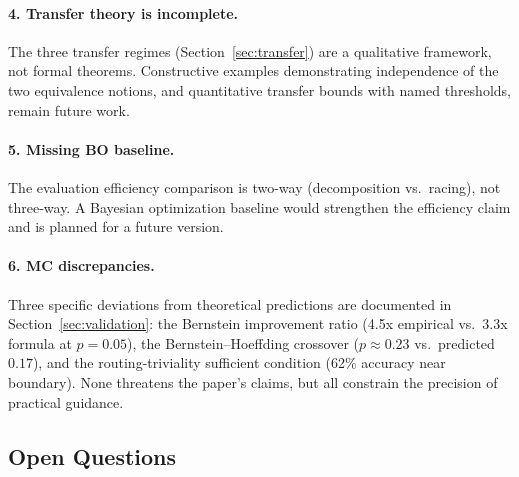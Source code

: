 \paragraph{4. Transfer theory is incomplete.}
The three transfer regimes (Section~\ref{sec:transfer}) are a qualitative framework, not formal theorems.
Constructive examples demonstrating independence of the two equivalence notions, and quantitative transfer bounds with named thresholds, remain future work.

\paragraph{5. Missing BO baseline.}
The evaluation efficiency comparison is two-way (decomposition vs.\ racing), not three-way.
A Bayesian optimization baseline would strengthen the efficiency claim and is planned for a future version.

\paragraph{6. MC discrepancies.}
Three specific deviations from theoretical predictions are documented in Section~\ref{sec:validation}: the Bernstein improvement ratio (4.5x empirical vs.\ 3.3x formula at $p = 0.05$), the Bernstein--Hoeffding crossover ($p \approx 0.23$ vs.\ predicted $0.17$), and the routing-triviality sufficient condition (62\% accuracy near boundary).
None threatens the paper's claims, but all constrain the precision of practical guidance.

\subsection{Open Questions}

